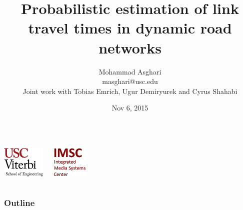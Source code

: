 \documentclass[t]{beamer}
\begin{document}
\graphicspath{ {../Manuscript/figures/}{Graphics/} }

\title[USC Viterbi School of Engineering]{Probabilistic estimation of link travel times in dynamic road networks}  
\author[Mohammad Asghari]{Mohammad Asghari\\ \small{masghari@usc.edu}\\ \vspace{0.1in} \tiny{Joint work with Tobias Emrich, Ugur Demiryurek and Cyrus Shahabi}}

\date{Nov 6, 2015} 

\begin{frame}
\titlepage
\begin{columns}
  \begin{center}
    \includegraphics[height=1.5cm]{viterbi_logo.jpg}   
  \end{center}
  \begin{center}
    \includegraphics[height=1.5cm]{imsc_logo.jpg}   
  \end{center}
\end{columns} 
\end{frame}

\begin{frame}\frametitle{Outline}\tableofcontents
\end{frame} 
\end{document}
